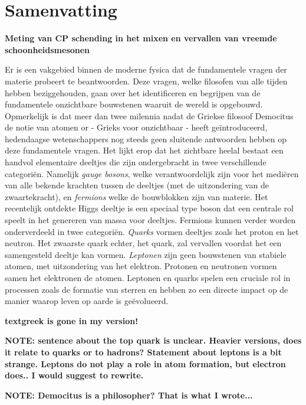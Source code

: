 \chapter*{Samenvatting}

{\Large\bf
  Meting van CP schending in het mixen en vervallen van vreemde schoonheidsmesonen
}
\vspace*{0.05\textwidth}


Er is een vakgebied binnen de moderne fysica dat de fundamentele vragen der materie probeert te beantwoorden. Deze vragen, welke filosofen van alle tijden hebben beziggehouden, gaan over het identificeren en begrijpen van de fundamentele onzichtbare bouwstenen waaruit de wereld is opgebouwd. Opmerkelijk is dat meer dan twee milennia nadat de Griekse filosoof Democitus de notie van atomen or \textgreek{} - Grieks voor onzichtbaar -  heeft ge\"introduceerd, hedendaagse wetenschappers nog steeds geen sluitende antwoorden hebben op deze fundamentele vragen. Het lijkt erop dat het zichtbare heelal bestaat een handvol elementaire deeltjes die zijn ondergebracht in twee verschillende categori\"en. Namelijk {\it gauge bosons}, welke verantwoordelijk zijn voor het medi\"eren van alle bekende krachten tussen de deeltjes (met de uitzondering van de zwaartekracht), en {\it fermions} welke de bouwblokken zijn van materie. Het recentelijk ontdekte Higgs deeltje \cite{higgs-cms,higgs-atlas} is een speciaal type boson dat een centrale rol speelt in het genereren van massa voor deeltjes. Fermions kunnen verder worden onderverdeeld in twee categori\"en. {\it Quarks} vormen deeltjes zoals het proton en het neutron. Het zwaarste quark echter, het \tquark quark, zal vervallen voordat het een samengesteld deeltje kan vormen. {\it Leptonen} zijn geen bouwstenen van stabiele atomen, met uitzondering van het elektron. Protonen en neutronen vormen samen het elektronen de atomen. Leptonen en quarks spelen een cruciale rol in processen zoals de formatie van sterren en hebben zo een directe impact op de manier waarop leven op aarde is ge\"evolueerd.

\textbf{ textgreek is gone in my version!}

\textbf{NOTE: sentence about the top quark is unclear. Heavier versions, does it relate to quarks or to hadrons?
Statement about leptons is a bit strange.
Leptons do not play a role in atom formation, but electron does.. I would suggest to rewrite.}

\textbf{NOTE: Democitus is a philosopher? That is what I wrote...}


